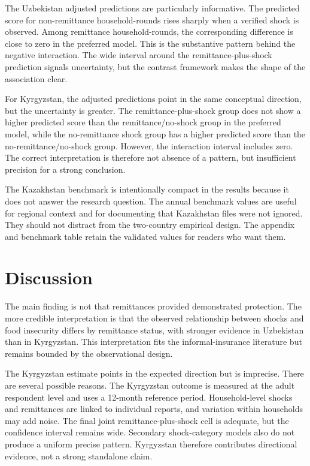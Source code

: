 \documentclass[11pt]{article}
\begin{document}
The Uzbekistan adjusted predictions are particularly informative. The predicted score for non-remittance household-rounds rises sharply when a verified shock is observed. Among remittance household-rounds, the corresponding difference is close to zero in the preferred model. This is the substantive pattern behind the negative interaction. The wide interval around the remittance-plus-shock prediction signals uncertainty, but the contrast framework makes the shape of the association clear.

For Kyrgyzstan, the adjusted predictions point in the same conceptual direction, but the uncertainty is greater. The remittance-plus-shock group does not show a higher predicted score than the remittance/no-shock group in the preferred model, while the no-remittance shock group has a higher predicted score than the no-remittance/no-shock group. However, the interaction interval includes zero. The correct interpretation is therefore not absence of a pattern, but insufficient precision for a strong conclusion.

The Kazakhstan benchmark is intentionally compact in the results because it does not answer the research question. The annual benchmark values are useful for regional context and for documenting that Kazakhstan files were not ignored. They should not distract from the two-country empirical design. The appendix and benchmark table retain the validated values for readers who want them.

\section{Discussion}

The main finding is not that remittances provided demonstrated protection. The more credible interpretation is that the observed relationship between shocks and food insecurity differs by remittance status, with stronger evidence in Uzbekistan than in Kyrgyzstan. This interpretation fits the informal-insurance literature but remains bounded by the observational design.

The Kyrgyzstan estimate points in the expected direction but is imprecise. There are several possible reasons. The Kyrgyzstan outcome is measured at the adult respondent level and uses a 12-month reference period. Household-level shocks and remittances are linked to individual reports, and variation within households may add noise. The final joint remittance-plus-shock cell is adequate, but the confidence interval remains wide. Secondary shock-category models also do not produce a uniform precise pattern. Kyrgyzstan therefore contributes directional evidence, not a strong standalone claim.
\end{document}

